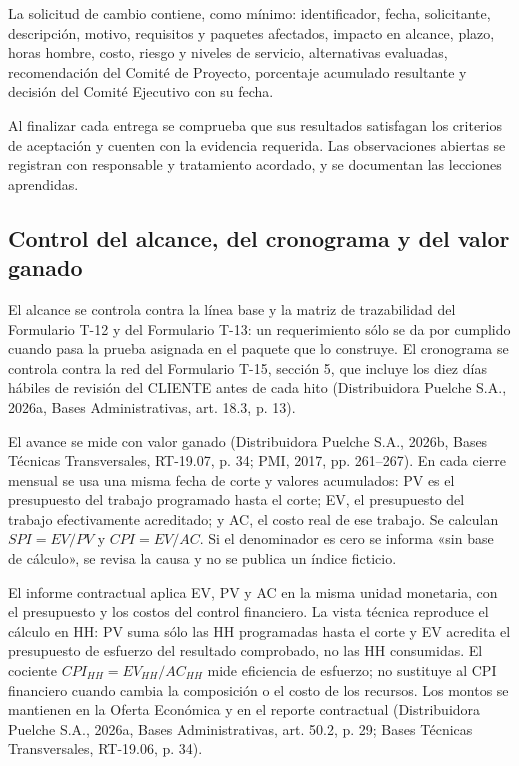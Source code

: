 \documentclass[carta,firma,final]{lafrox}
\begin{document}
La solicitud de cambio contiene, como mínimo: identificador, fecha, solicitante, descripción, motivo, requisitos y paquetes afectados, impacto en alcance, plazo, horas hombre, costo, riesgo y niveles de servicio, alternativas evaluadas, recomendación del Comité de Proyecto, porcentaje acumulado resultante y decisión del Comité Ejecutivo con su fecha.

Al finalizar cada entrega se comprueba que sus resultados satisfagan los criterios de aceptación y cuenten con la evidencia requerida. Las observaciones abiertas se registran con responsable y tratamiento acordado, y se documentan las lecciones aprendidas.

\subsection{Control del alcance, del cronograma y del valor ganado}

El alcance se controla contra la línea base y la matriz de trazabilidad del Formulario T-12 y del Formulario T-13: un requerimiento sólo se da por cumplido cuando pasa la prueba asignada en el paquete que lo construye. El cronograma se controla contra la red del Formulario T-15, sección 5, que incluye los diez días hábiles de revisión del CLIENTE antes de cada hito (Distribuidora Puelche S.A., 2026a, Bases Administrativas, art. 18.3, p. 13).

El avance se mide con valor ganado (Distribuidora Puelche S.A., 2026b, Bases Técnicas Transversales, RT-19.07, p. 34; PMI, 2017, pp. 261--267). En cada cierre mensual se usa una misma fecha de corte y valores acumulados: PV es el presupuesto del trabajo programado hasta el corte; EV, el presupuesto del trabajo efectivamente acreditado; y AC, el costo real de ese trabajo. Se calculan \(SPI=EV/PV\) y \(CPI=EV/AC\). Si el denominador es cero se informa «sin base de cálculo», se revisa la causa y no se publica un índice ficticio.

El informe contractual aplica EV, PV y AC en la misma unidad monetaria, con el presupuesto y los costos del control financiero. La vista técnica reproduce el cálculo en HH: PV suma sólo las HH programadas hasta el corte y EV acredita el presupuesto de esfuerzo del resultado comprobado, no las HH consumidas. El cociente \(CPI_{HH}=EV_{HH}/AC_{HH}\) mide eficiencia de esfuerzo; no sustituye al CPI financiero cuando cambia la composición o el costo de los recursos. Los montos se mantienen en la Oferta Económica y en el reporte contractual (Distribuidora Puelche S.A., 2026a, Bases Administrativas, art. 50.2, p. 29; Bases Técnicas Transversales, RT-19.06, p. 34).
\end{document}
